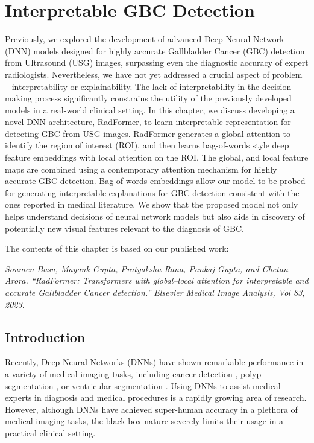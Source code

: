 \chapter{Interpretable GBC Detection}
%
\label{chap:radformer}
%
Previously, we explored the development of advanced Deep Neural Network (DNN) models designed for highly accurate Gallbladder Cancer (GBC) detection from Ultrasound (USG) images, surpassing even the diagnostic accuracy of expert radiologists. Nevertheless, we have not yet addressed a crucial aspect of problem -- interpretability or explainability. The lack of interpretability in the decision-making process significantly constrains the utility of the previously developed models in a real-world clinical setting.
In this chapter, we discuss developing a novel DNN architecture, RadFormer, to learn interpretable representation for detecting GBC from USG images. RadFormer generates a global attention to identify the region of interest (ROI), and then learns bag-of-words style deep feature embeddings with local attention on the ROI. The global, and local feature maps are combined using a contemporary attention mechanism for highly accurate GBC detection. Bag-of-words embeddings allow our model to be probed for generating interpretable explanations for GBC detection consistent with the ones reported in medical literature. We show that the proposed model not only helps understand decisions of neural network models but also aids in discovery of potentially new visual features relevant to the diagnosis of GBC. %
\par The contents of this chapter is based on our published work:
\par \noindent [1] \textit{Soumen Basu, Mayank Gupta, Pratyaksha Rana, Pankaj Gupta, and Chetan Arora. ``RadFormer: Transformers with global–local attention for interpretable and accurate Gallbladder Cancer detection.'' Elsevier Medical Image Analysis, Vol 83, 2023}.

\section{Introduction}
%
Recently, Deep Neural Networks (DNNs) have shown remarkable performance in a variety of medical imaging tasks, including cancer detection \cite{chu2019application, codella2017deep, kooi2017large, langlotz2019roadmap, pirovano2021computer}, polyp segmentation \cite{wu2021collaborative, wu2022polypseg, wu2021precise}, or ventricular segmentation \cite{wu2022semi, wu2021automated}. Using DNNs to assist medical experts in diagnosis and medical procedures is a rapidly growing area of research. However, although DNNs have achieved super-human accuracy in a plethora of medical imaging tasks, the black-box nature severely limits their usage in a practical clinical setting. 

